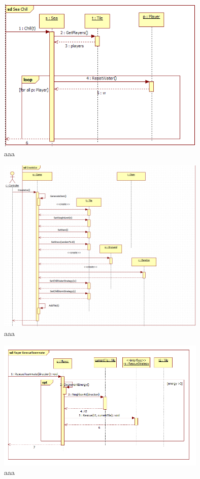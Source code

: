 \begin{figure}[H]
	\begin{center}
		\includegraphics[width=10cm]{chapters/chapter03/seqdiag/Sea_Chill.png}
		\caption{aaa}
		\label{bbb}
	\end{center}
\end{figure}
\begin{figure}[H]
	\begin{center}
		\includegraphics[width=10cm]{chapters/chapter03/seqdiag/Game_CreateIce.png}
		\caption{aaa}
		\label{bbb}
	\end{center}
\end{figure}
\begin{figure}[H]
	\begin{center}
		\includegraphics[width=10cm]{chapters/chapter03/seqdiag/Player_RescueTeammate.png}
		\caption{aaa}
		\label{bbb}
	\end{center}
\end{figure}
